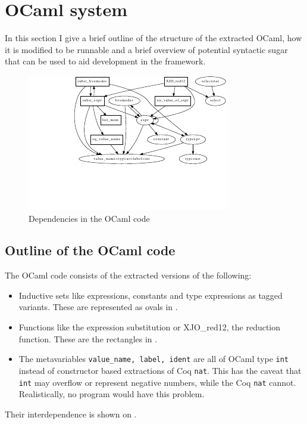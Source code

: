 \documentclass[12pt,twoside,notitlepage]{report}
\begin{document}
\section{OCaml system}
In this section I give a brief outline of the structure of the extracted OCaml, how it is modified to be runnable and a brief overview of potential syntactic sugar that can be used to aid development in the framework. 
\begin{figure}
\centering
\includegraphics[width=\linewidth]{ocamlBaseStruct.pdf}
\caption{Dependencies in the OCaml code}
\label{fig:ocamlBaseStruct}
\end{figure}
\subsection{Outline of the OCaml code}
The OCaml code consists of the extracted versions of the following:
\begin{itemize}
\item{Inductive sets like expressions, constants and type expressions as tagged variants. These are represented as ovals in .}
\item{Functions like the expression substitution or XJO\_red12, the reduction function. These are the rectangles in .}
\item{The metavariables \verb|value_name, label, ident| are all of OCaml type \lstinline|int| instead of constructor based extractions of Coq \lstinline[language={Coq}]|nat|. This has the caveat that \lstinline|int| may overflow or represent negative numbers, while the Coq \lstinline[language={Coq}]|nat| cannot. Realistically, no program would have this problem.}
\end{itemize}
Their interdependence is shown on . 
\end{document}
